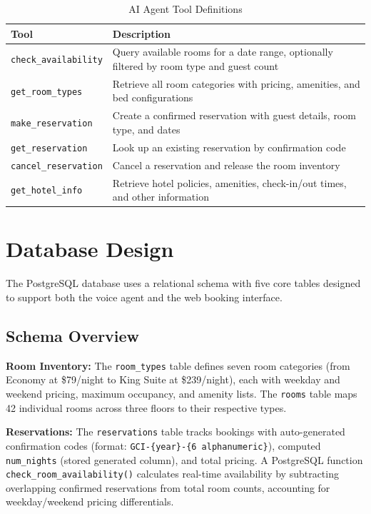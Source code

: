 \documentclass[conference]{IEEEtran}
\begin{document}
\begin{table}[!t]
\centering
\caption{AI Agent Tool Definitions}
\label{tab:tools}
\begin{tabular}{@{}p{2.5cm}p{5cm}@{}}
\toprule
\textbf{Tool} & \textbf{Description} \\
\midrule
\texttt{check\_availability} & Query available rooms for a date range, optionally filtered by room type and guest count \\
\texttt{get\_room\_types} & Retrieve all room categories with pricing, amenities, and bed configurations \\
\texttt{make\_reservation} & Create a confirmed reservation with guest details, room type, and dates \\
\texttt{get\_reservation} & Look up an existing reservation by confirmation code \\
\texttt{cancel\_reservation} & Cancel a reservation and release the room inventory \\
\texttt{get\_hotel\_info} & Retrieve hotel policies, amenities, check-in/out times, and other information \\
\bottomrule
\end{tabular}
\end{table}

\section{Database Design}

The PostgreSQL database uses a relational schema with five core tables designed to support both the voice agent and the web booking interface.

\subsection{Schema Overview}

\textbf{Room Inventory:} The \texttt{room\_types} table defines seven room categories (from Economy at \$79/night to King Suite at \$239/night), each with weekday and weekend pricing, maximum occupancy, and amenity lists. The \texttt{rooms} table maps 42 individual rooms across three floors to their respective types.

\textbf{Reservations:} The \texttt{reservations} table tracks bookings with auto-generated confirmation codes (format: \texttt{GCI-\{year\}-\{6 alphanumeric\}}), computed \texttt{num\_nights} (stored generated column), and total pricing. A PostgreSQL function \texttt{check\_room\_availability()} calculates real-time availability by subtracting overlapping confirmed reservations from total room counts, accounting for weekday/weekend pricing differentials.
\end{document}
